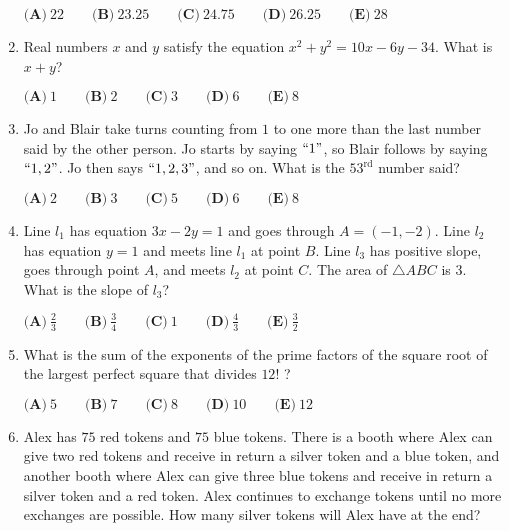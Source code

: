 \documentclass{article}
\begin{document}
\begin{enumerate}[label=\arabic*., itemsep=0.5em]
\(\textbf{(A)}\ 22 \qquad \textbf{(B)}\ 23.25 \qquad \textbf{(C)}\ 24.75 \qquad \textbf{(D)}\ 26.25 \qquad \textbf{(E)}\ 28\)\par \vspace{0.5em}\item Real numbers \(x\) and \(y\) satisfy the equation \(x^2 + y^2 = 10x - 6y - 34\). What is \(x + y\)?

\(\textbf{(A)}\ 1 \qquad \textbf{(B)}\ 2 \qquad \textbf{(C)}\ 3 \qquad \textbf{(D)}\ 6 \qquad \textbf{(E)}\ 8\)\par \vspace{0.5em}\item Jo and Blair take turns counting from \(1\) to one more than the last number said by the other person. Jo starts by saying \(``1"\), so Blair follows by saying \(``1, 2"\). Jo then says \(``1, 2, 3"\), and so on. What is the \(53^{\text{rd}}\) number said?

\(\textbf{(A)}\ 2 \qquad \textbf{(B)}\ 3 \qquad \textbf{(C)}\ 5 \qquad \textbf{(D)}\ 6 \qquad \textbf{(E)}\ 8\)\par \vspace{0.5em}\item Line \(l_1\) has equation \(3x - 2y = 1\) and goes through \(A = (-1, -2)\). Line \(l_2\) has equation \(y = 1\) and meets line \(l_1\) at point \(B\). Line \(l_3\) has positive slope, goes through point \(A\), and meets \(l_2\) at point \(C\). The area of \(\triangle ABC\) is \(3\). What is the slope of \(l_3\)?

\(\textbf{(A)}\ \frac{2}{3} \qquad \textbf{(B)}\ \frac{3}{4} \qquad \textbf{(C)}\ 1 \qquad \textbf{(D)}\ \frac{4}{3} \qquad \textbf{(E)}\ \frac{3}{2}\)\par \vspace{0.5em}\item What is the sum of the exponents of the prime factors of the square root of the largest perfect square that divides \(12!\) ?

\(\textbf{(A)}\ 5 \qquad \textbf{(B)}\ 7 \qquad \textbf{(C)}\ 8 \qquad \textbf{(D)}\ 10 \qquad \textbf{(E)}\ 12 \)\par \vspace{0.5em}\item Alex has \(75\) red tokens and \(75\) blue tokens. There is a booth where Alex can give two red tokens and receive in return a silver token and a blue token, and another booth where Alex can give three blue tokens and receive in return a silver token and a red token. Alex continues to exchange tokens until no more exchanges are possible. How many silver tokens will Alex have at the end?


\end{enumerate}
\end{document}
